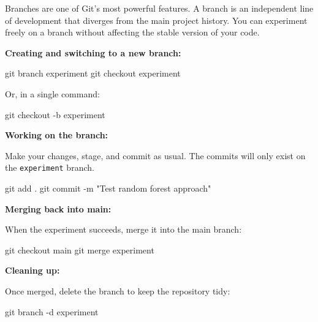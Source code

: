 \documentclass[
  letterpaper,
  DIV=11,
  numbers=noendperiod]{scrartcl}
\newenvironment{Shaded}{\begin{snugshade}}{\end{snugshade}}
\newcommand{\AttributeTok}[1]{\textcolor[rgb]{0.40,0.45,0.13}{#1}}
\newcommand{\FunctionTok}[1]{\textcolor[rgb]{0.28,0.35,0.67}{#1}}
\newcommand{\NormalTok}[1]{\textcolor[rgb]{0.00,0.23,0.31}{#1}}
\newcommand{\StringTok}[1]{\textcolor[rgb]{0.13,0.47,0.30}{#1}}
\begin{document}
Branches are one of Git's most powerful features. A branch is an
independent line of development that diverges from the main project
history. You can experiment freely on a branch without affecting the
stable version of your code.

\textbf{Creating and switching to a new branch:}

\begin{Shaded}
\begin{Highlighting}[]
\FunctionTok{git}\NormalTok{ branch experiment}
\FunctionTok{git}\NormalTok{ checkout experiment}
\end{Highlighting}
\end{Shaded}

Or, in a single command:

\begin{Shaded}
\begin{Highlighting}[]
\FunctionTok{git}\NormalTok{ checkout }\AttributeTok{{-}b}\NormalTok{ experiment}
\end{Highlighting}
\end{Shaded}

\textbf{Working on the branch:}

Make your changes, stage, and commit as usual. The commits will only
exist on the \texttt{experiment} branch.

\begin{Shaded}
\begin{Highlighting}[]
\FunctionTok{git}\NormalTok{ add .}
\FunctionTok{git}\NormalTok{ commit }\AttributeTok{{-}m} \StringTok{"Test random forest approach"}
\end{Highlighting}
\end{Shaded}

\textbf{Merging back into main:}

When the experiment succeeds, merge it into the main branch:

\begin{Shaded}
\begin{Highlighting}[]
\FunctionTok{git}\NormalTok{ checkout main}
\FunctionTok{git}\NormalTok{ merge experiment}
\end{Highlighting}
\end{Shaded}

\textbf{Cleaning up:}

Once merged, delete the branch to keep the repository tidy:

\begin{Shaded}
\begin{Highlighting}[]
\FunctionTok{git}\NormalTok{ branch }\AttributeTok{{-}d}\NormalTok{ experiment}
\end{Highlighting}
\end{Shaded}
\end{document}
